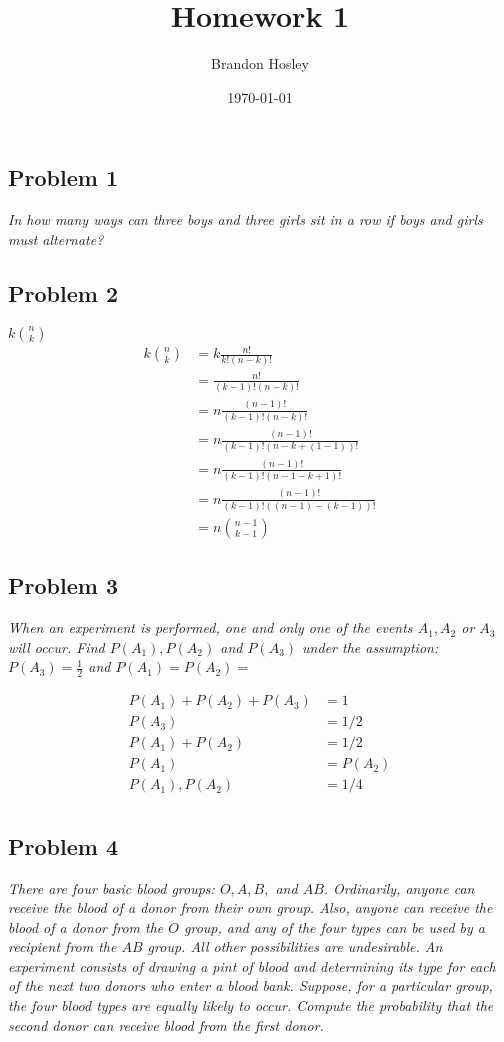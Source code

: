 \documentclass[a4paper,man,natbib]{apa6}
\title{Homework 1}
\author{Brandon Hosley}
\date{\today}
\affiliation{STAT 587 - Introduction to Probability and Statistics}
\begin{document}
\maketitle
\raggedbottom
\singlespacing

\subsection{Problem 1}
\emph{In how many ways can three boys and three girls sit in a row if boys and girls must alternate?}

\subsection{Problem 2}
\emph{$k\binom{n}{k}$}
\doublespacing
\begin{align*}
	k \binom{n}{k} &=  k \frac{n!}{k!(n-k)!} \\
	&= \frac{n!}{(k-1)!(n-k)!} \\
	&= n\frac{(n-1)!}{(k-1)!(n-k)!} \\
	&= n\frac{(n-1)!}{(k-1)!(n-k+(1-1))!} \\
	&= n\frac{(n-1)!}{(k-1)!(n-1-k+1)!} \\
	&= n\frac{(n-1)!}{(k-1)!((n-1)-(k-1))!} \\
	&= n\binom{n-1}{k-1}
\end{align*}
\singlespacing

\subsection{Problem 3}
\emph{When an experiment is performed, one and only one of the events $A_1,A_2$ or $A_3$ will occur. 
	Find $P(A_1), P(A_2)$ and $P(A_3)$ under the assumption: $P(A_3) = \frac{1}{2}$ and $P(A_1) = P(A_2)=$}

\begin{align*}
	P(A_1) + P(A_2) + P(A_3) &= 1 \\
	P(A_3) &= 1/2 \\
	P(A_1) + P(A_2) &= 1/2 \\
	P(A_1) &= P(A_2) \\
	P(A_1), P(A_2) &= 1/4 \\
\end{align*}

\subsection{Problem 4}
\emph{There are four basic blood groups: $O, A, B,$ and $AB$. 
	Ordinarily, anyone can receive the blood of a donor from their own group. Also, anyone can receive the blood of a donor from the $O$ group, and any of the four types can be used by a recipient from the $AB$ group. All other possibilities are undesirable. An experiment consists of drawing a pint of blood and determining its type for each of the next two donors who enter a blood bank. Suppose, for a particular group, the four blood types are equally likely to occur. Compute the probability that the second donor can receive blood from the first donor.} \vspace{1em}
\end{document}

